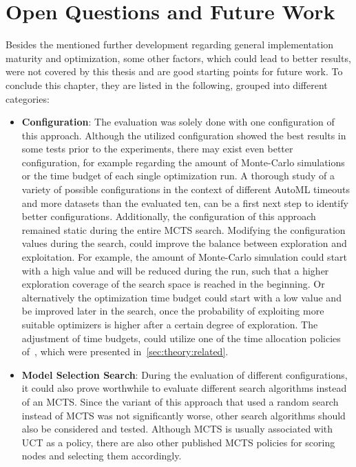 \section{Open Questions and Future Work}
Besides the mentioned further development regarding general implementation maturity and optimization, some other factors, which could lead to better results, were not covered by this thesis and are good starting points for future work.
To conclude this chapter, they are listed in the following, grouped into different categories:
\begin{itemize}
    \item \textbf{Configuration}: The evaluation was solely done with one configuration of this approach.
    Although the utilized configuration showed the best results in some tests prior to the experiments, there may exist even better configuration, for example regarding the amount of Monte-Carlo simulations or the time budget of each single optimization run.
    A thorough study of a variety of possible configurations in the context of different AutoML timeouts and more datasets than the evaluated ten, can be a first next step to identify better configurations.\newline
    Additionally, the configuration of this approach remained static during the entire MCTS search.
    Modifying the configuration values during the search, could improve the balance between exploration and exploitation.
    For example, the amount of Monte-Carlo simulation could start with a high value and will be reduced during the run, such that a higher exploration coverage of the search space is reached in the beginning.
    Or alternatively the optimization time budget could start with a low value and be improved later in the search, once the probability of exploiting more suitable optimizers is higher after a certain degree of exploration.
    The adjustment of time budgets, could utilize one of the time allocation policies of~\textcite{Quemy-Two-Stage-Optimization}, which were presented in~\ref{sec:theory:related}.
    \item \textbf{Model Selection Search}: During the evaluation of different configurations, it could also prove worthwhile to evaluate different search algorithms instead of an MCTS.
    Since the variant of this approach that used a random search instead of MCTS was not significantly worse, other search algorithms should also be considered and tested.\newline
    Although MCTS is usually associated with UCT as a policy, there are also other published MCTS policies for scoring nodes and selecting them accordingly.

\end{itemize}
